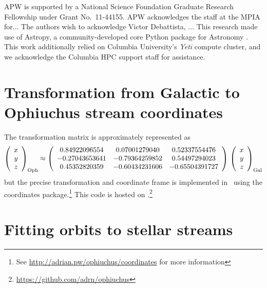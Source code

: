 \documentclass[letterpaper,12pt,preprint]{aastex}
\begin{document}
\acknowledgements
APW is supported by a National Science Foundation Graduate Research Fellowship under Grant No.\ 11-44155.
APW acknowledges the staff at the MPIA for...
The authors wish to acknowledge Victor Debattista, ...
This research made use of Astropy, a community-developed core Python package for Astronomy \citep{astropy13}.
This work additionally relied on Columbia University's \emph{Yeti} compute cluster, and we acknowledge the Columbia HPC support staff for assistance. \\




\appendix
\section{Transformation from Galactic to Ophiuchus stream coordinates} \label{sec:rotationmatrix}
The transformation matrix is approximately represented as
\begin{equation*}
\left( \begin{array}{c}
x \\
y \\
z \end{array} \right)_{\rm Oph} \approx
\left( \begin{array}{ccc}
0.84922096554 & 0.07001279040 & 0.52337554476\\
-0.27043653641 & -0.79364259852 &  0.54497294023\\
0.45352820359 & -0.60434231606 & -0.65504391727
\end{array} \right) \,
\left( \begin{array}{c}
x \\
y \\
z \end{array} \right)_{\rm Gal}
\end{equation*}
but the precise transformation and coordinate frame is implemented in \python\ using the  coordinates package.\footnote{See \url{http://adrian.pw/ophiuchus/coordinates} for more information}  This code is hosted on .\footnote{\url{https://github.com/adrn/ophiuchus}} 

\section{Fitting orbits to stellar streams}\label{sec:orbitfit}
\end{document}
